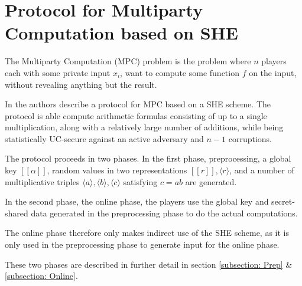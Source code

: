 \documentclass{article}
\begin{document}
\section{Protocol for Multiparty Computation based on SHE} \label{section: MPC scheme}
The Multiparty Computation (MPC) problem is the problem where $n$ players each with some private input $x_i$, want to compute some function $f$ on the input, without revealing anything but the result.

In \cite{damgaard2012multiparty} the authors describe a protocol for MPC based on a SHE scheme. The protocol is able compute arithmetic formulas consisting of up to a single multiplication, along with a relatively large number of additions, while being statistically UC-secure against an active adversary and $n - 1$ corruptions.

The protocol proceeds in two phases. In the first phase, preprocessing, a global key $[\![\alpha]\!]$, random values in two representations $[\![r]\!], \langle r \rangle$, and a number of multiplicative triples $\langle a \rangle, \langle b \rangle, \langle c \rangle$ satisfying $c = ab$ are generated.

In the second phase, the online phase, the players use the global key and secret-shared data generated in the preprocessing phase to do the actual computations.

The online phase therefore only makes indirect use of the SHE scheme, as it is only used in the preprocessing phase to generate input for the online phase.

These two phases are described in further detail in section \ref{subsection: Prep} \& \ref{subsection: Online}.
\end{document}
